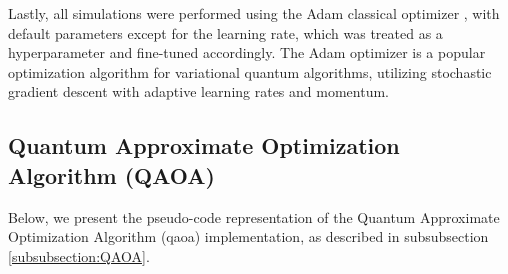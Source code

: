 Lastly, all simulations were performed using the Adam classical optimizer \cite{kingma2017adam}, with default parameters except for the learning rate, which was treated as a hyperparameter and fine-tuned accordingly. The Adam optimizer is a popular optimization algorithm for variational quantum algorithms, utilizing stochastic gradient descent with adaptive learning rates and momentum.



\subsection{Quantum Approximate Optimization Algorithm (QAOA)}
\label{subsection:QAOA_Implementation}


Below, we present the pseudo-code representation of the Quantum Approximate Optimization Algorithm (\acrshort{qaoa}) implementation, as described in subsubsection \ref{subsubsection:QAOA}.


